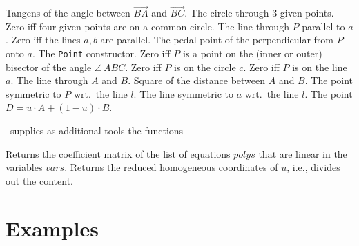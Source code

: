 	{Tangens of the angle between $\vec{BA}$ and $\vec{BC}$. }
	{The circle through 3 given points. }
	{Zero iff four given points are on a common circle. }
	{The line through $P$ parallel to $a$. } 
	{Zero iff the lines $a,b$ are parallel. }
	{The pedal point of the perpendicular from $P$ onto $a$.} 
	{The {\tt Point} constructor.}
	{Zero iff $P$ is a point on the (inner or outer) bisector of the 
	angle $\angle\,ABC$.}  
	{Zero iff $P$ is on the circle $c$.} 
	{Zero iff $P$ is on the line $a$. }
	{The line through $A$ and $B$.}
	{Square of the distance between $A$ and $B$.} 
	{The point symmetric to $P$ wrt.\  the line $l$.} 
	{The line symmetric to $a$ wrt.\ the line $l$.} 
	{The point $D=u\cdot A+(1-u)\cdot B$. }

\noindent \geo \ supplies as additional tools the functions
\bigskip

{Returns the coefficient matrix of the list of equations $polys$ that are 
linear in the variables $vars$. }
{Returns the reduced homogeneous coordinates of $u$, i.e., divides out the 
content. }

\newpage 

\section{Examples}

\example

